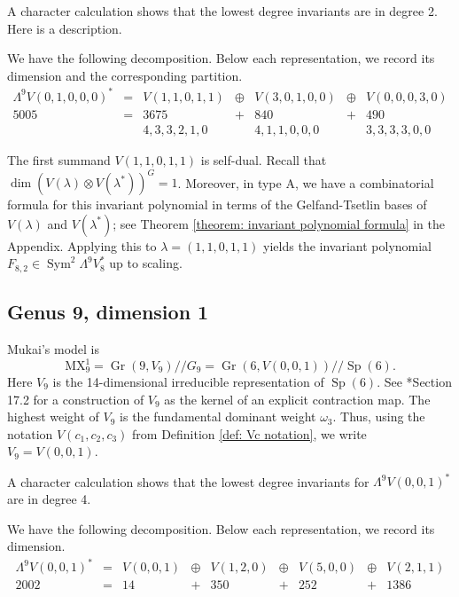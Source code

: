 \documentclass{amsart}[12pt]
\theoremstyle{definition}
\numberwithin{equation}{section}
\newcommand{\Sym}{\operatorname{Sym}}
\newcommand{\Sp}{\operatorname{Sp}}
\newcommand{\Gr}{\operatorname{Gr}}
\newcommand{\git}{/\!\!/}
\newcommand{\mywedge}{\mathsf{\Lambda}}
\newcommand{\mukai}{\mathrm{MX}}
\newcommand{\LieG}{G}
\begin{document}
A character calculation shows that the lowest degree invariants are in
degree 2. Here is a description.

We have the following decomposition. Below each representation, we
record its dimension and the corresponding partition.
\[
\begin{array}{ccccccc}
  \mywedge^9 V(0,1,0,0,0)^{*} & = & V(1,1,0,1,1) & \oplus & V(3,0,1,0,0) & \oplus & V(0,0,0,3,0)
  \\
  5005 & = & 3675 &+ & 840 &+ & 490 \\
           &    & 4,3,3,2,1,0 && 4,1,1,0,0,0 & & 3,3,3,3,0,0
\end{array}
\]


The first summand $V(1,1,0,1,1)$ is self-dual. Recall that
$\dim (V(\lambda) \otimes V(\lambda^{*}))^G=1$. Moreover, in type A, we have a
combinatorial formula for this invariant polynomial in terms of the
Gelfand-Tsetlin bases of $V(\lambda)$ and $V(\lambda^{*})$; see Theorem \ref{theorem: invariant polynomial formula} in the Appendix. Applying this to $\lambda =
(1,1,0,1,1)$ yields the invariant polynomial $F_{8,2} \in \Sym^2 \mywedge^9 V_8^{*}$ up to scaling. 



\subsection{Genus 9, dimension 1}
Mukai's model is
\[
\mukai^{1}_9 =  \Gr(9,V_9) \git \LieG_9 = \Gr(6,V(0,0,1)) \git \Sp(6).
\]
Here $V_9$ is the 14-dimensional irreducible representation of 
$\Sp(6)$. See \cite{FH}*{Section 17.2} for a construction of $V_9$ as
the kernel of an explicit contraction map. The highest
weight of $V_9$ is the fundamental dominant weight
$\omega_3$. Thus, using the notation $V(c_1,c_2,c_3)$ from
Definition \ref{def: Vc notation}, we write $V_9 = V(0,0,1)$.  

A character calculation shows that the lowest degree invariants for $\mywedge^9 V(0,0,1)^{*}$ are in
degree 4.

We have the following decomposition. Below each representation, we
record its dimension.
\[
\begin{array}{ccccccccc}
  \mywedge^9 V(0,0,1)^{*} & = & V(0,0,1) & \oplus & V(1,2,0) & \oplus & V(5,0,0) & \oplus & V(2,1,1)
  \\
  2002 & = & 14 &+ & 350 &+ & 252 &+ & 1386 
\end{array}
\]




\end{document}
